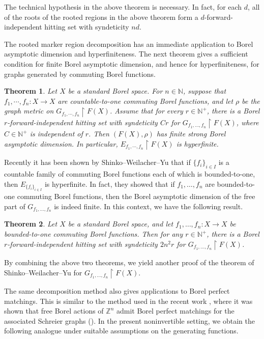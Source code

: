 \documentclass[11pt, reqno, a4paper]{amsart}
\newtheorem{theorem}{Theorem}[section]
\theoremstyle{definition}
\theoremstyle{plain}
\begin{document}
The technical hypothesis in the above theorem is necessary. In fact, for each $d$, all of the roots of the rooted regions in the above theorem form a $d$-forward-independent hitting set with syndeticity $nd$. 

The rooted marker region decomposition has an immediate application to Borel
asymptotic dimension and hyperfiniteness.
The next theorem gives a sufficient condition for finite Borel asymptotic
dimension, and hence for hyperfiniteness, for graphs generated by commuting
Borel functions.

\begin{theorem}
Let $X$ be a standard Borel space. For $n\in\mathbb{N}$, suppose that $f_1,\cdots,f_n:X\to X$ are countable-to-one commuting Borel functions, and let $\rho$ be the graph metric on $G_{f_1,\cdots,f_n}\upharpoonright F(X)$. Assume that for every $r\in\mathbb N^+$, there is a Borel $r$-forward-independent hitting set with syndeticity $Cr$ for $G_{f_1,\ldots,f_n}\upharpoonright F(X)$, where $C\in\mathbb N^+$ is independent of $r$. 
Then $(F(X),\rho)$ has finite strong Borel asymptotic dimension. In particular,
$E_{f_1,\cdots,f_n}\upharpoonright F(X)$ is hyperfinite.
\end{theorem}

Recently it has been shown by Shinko--Weilacher--Yu \cite{NaryshkinShinkoWeilacherYuCommutingFunctions} that if $\{f_i\}_{i\in I}$ is a countable family of commuting Borel functions each of which is bounded-to-one, then $E_{\{f_i\}_{i\in I}}$ is hyperfinite. In fact, they showed that if $f_1, \dots, f_n$ are bounded-to-one commuting Borel functions, then the Borel asymptotic dimension of the free part of $G_{f_1,\dots, f_n}$ is indeed finite. In this context, we have the following result.

\begin{theorem} Let $X$ be a standard Borel space, and let $f_1, \dots, f_n\colon X\to X$ be bounded-to-one commuting Borel functions. Then for any $r\in \mathbb{N}^+$, there is a Borel $r$-forward-independent hitting set with syndeticity $2n^2r$ for $G_{f_1,\dots, f_n}\upharpoonright F(X)$.
\end{theorem}

By combining the above two theorems, we yield another proof of the theorem of Shinko--Weilacher--Yu \cite{NaryshkinShinkoWeilacherYuCommutingFunctions} for $G_{f_1,\dots, f_n}\upharpoonright F(X)$.

The same decomposition method also gives applications to Borel perfect
matchings. This is similar to the method used in the recent work \cite{GaoJacksonKrohneSeward2024},
where it was shown that free Borel actions of $\mathbb Z^n$ admit Borel perfect
matchings for the associated Schreier graphs (\cite[Theorem~6.1]{GaoJacksonKrohneSeward2024}).
In the present noninvertible setting, we obtain the following analogue under
suitable assumptions on the generating functions.
\end{document}
